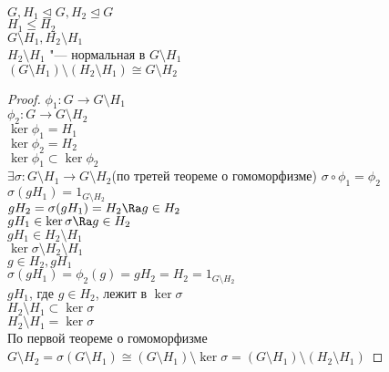 \begin{theorem}
$G, H_1 \unlhd G, H_2 \unlhd G$\\
$H_1 \le H_2$\\
$G\setminus H_1, H_2 \setminus H_1$\\
$H_2 \setminus H_1$  "--- нормальная в $G \setminus H_1$\\
$(G \setminus H_1)\setminus(H_2 \setminus H_1) \cong G \setminus H_2$\\
\end{theorem}
\begin{proof}
$\phi_1 \colon G \to G \setminus H_1$\\
$\phi_2 \colon G \to G \setminus H_2$\\
$\ker \phi_1 = H_1$\\
$\ker \phi_2 = H_2$\\
$\ker \phi_1 \subset \ker \phi_2$\\
$\exists \sigma \colon G \setminus H_1 \to G \setminus H_2$(по третей теореме о гомоморфизме)
$\sigma \circ \phi_1 = \phi_2$\\
$\sigma(gH_1) = 1_{G \setminus H_2}$\\
$gH_2 = \sigma(gH_1) = H_2 \Ra g \in H_2$\\

$gH_1 \in \ker \sigma \Ra g \in H_2$\\
$gH_1 \in H_2 \setminus H_1$\\
$\ker \sigma \setminus H_2 \setminus H_1$\\

$g \in H_2, gH_1$\\
$\sigma(gH_1) = \phi_2(g) = gH_2 = H_2 = 1_{G\setminus H_2}$\\
$gH_1$, где $g \in H_2$, лежит в $\ker \sigma$\\
$H_2 \setminus H_1 \subset \ker \sigma$\\
$H_2 \setminus H_1 = \ker \sigma$\\

По первой теореме о гомоморфизме 
$G \setminus H_2 = \sigma (G \setminus H_1) \cong (G \setminus H_1)\setminus \ker \sigma = (G\setminus H_1)\setminus(H_2 \setminus H_1)$

\end{proof}
